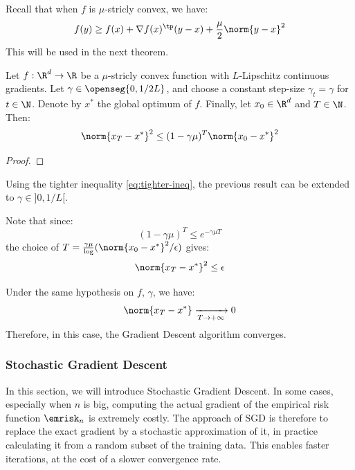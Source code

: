 \documentclass{../cs-classes/cs-classes}
\begin{document}
Recall that when $f$ is $\mu$-stricly convex, we have:
\begin{equation*}
    f(y)\geq f(x)+\nabla f(x)^\tp(y-x)+\frac{\mu}{2}\norm{y-x}^2
\end{equation*}
This will be used in the next theorem.

\begin{theorem}
    Let $f:\R^d\to\R$ be a $\mu$-stricly convex function with $L$-Lipschitz continuous gradients. Let $\gamma\in\openseg{0, 1/2L}$, and choose a constant step-size $\gamma_t=\gamma$ for $t\in\N$. Denote by $x^*$ the global optimum of $f$. Finally, let $x_0\in\R^d$ and $T\in\N$. Then:
    \begin{equation*}
        \norm{x_T-x^*}^2\leq(1-\gamma\mu)^T\norm{x_0-x^*}^2
    \end{equation*}
\end{theorem}
\begin{proof}
\end{proof}

\begin{remark}
    Using the tighter inequality \eqref{eq:tighter-ineq}, the previous result can be extended to $\gamma\in\rbrack 0, 1/L\lbrack$.
\end{remark}

Note that since:
\begin{equation*}
    (1-\gamma\mu)^T\leq e^{-\gamma\mu T}
\end{equation*}
the choice of $T=\frac{\gamma\mu}\log(\norm{x_0-x^*}^2/\epsilon)$ gives:
\begin{equation*}
    \norm{x_T-x^*}^2\leq\epsilon
\end{equation*}

\begin{corollary}
    Under the same hypothesis on $f$, $\gamma$, we have:
    \begin{equation*}
        \norm{x_T-x^*} \xrightarrow[T\to+\infty]{} 0
    \end{equation*}
    Therefore, in this case, the Gradient Descent algorithm converges.
\end{corollary}

\subsubsection{Stochastic Gradient Descent}
In this section, we will introduce Stochastic Gradient Descent. In some cases, especially when $n$ is big, computing the actual gradient of the empirical risk function $\emrisk_n$ is extremely costly. The approach of SGD is therefore to replace the exact gradient by a stochastic approximation of it, in practice calculating it from a random subset of the training data. This enables faster iterations, at the cost of a slower convergence rate.
\end{document}
